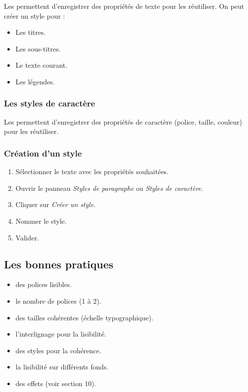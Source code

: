 Les  permettent d'enregistrer des propriétés de texte pour les réutiliser. On peut créer un style pour :

\begin{itemize}
    \item Les titres.
    \item Les sous-titres.
    \item Le texte courant.
    \item Les légendes.
\end{itemize}

\subsubsection{Les styles de caractère}

Les  permettent d'enregistrer des propriétés de caractère (police, taille, couleur) pour les réutiliser.

\subsubsection{Création d'un style}

\begin{enumerate}
    \item Sélectionner le texte avec les propriétés souhaitées.
    \item Ouvrir le panneau \emph{Styles de paragraphe} ou \emph{Styles de caractère}.
    \item Cliquer sur \emph{Créer un style}.
    \item Nommer le style.
    \item Valider.
\end{enumerate}

\subsection{Les bonnes pratiques}

\begin{itemize}
    \item {} des polices lisibles.
    \item {} le nombre de polices (1 à 2).
    \item {} des tailles cohérentes (échelle typographique).
    \item {} l'interlignage pour la lisibilité.
    \item {} des styles pour la cohérence.
    \item {} la lisibilité sur différents fonds.
    \item {} des effets (voir section 10).
\end{itemize}

